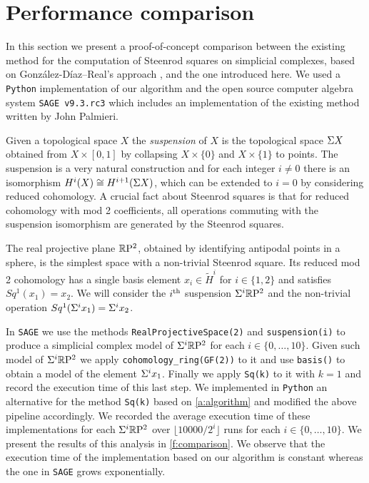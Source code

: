 
\section{Performance comparison} \label{s:comparison}

In this section we present a proof-of-concept comparison between the existing method for the computation of Steenrod squares on simplicial complexes, based on Gonz\'alez-D\'iaz--Real's approach \cite[Corollary 3.2]{gonzalez1999combinatorial}, and the one introduced here.
We used a \verb|Python| implementation of our algorithm and the open source computer algebra system \verb|SAGE v9.3.rc3| \cite{sagemath} which includes an implementation of the existing method written by John Palmieri.

Given a topological space $X$ the \textit{suspension} of $X$ is the topological space $\Sigma X$ obtained from $X \times [0,1]$ by collapsing $X \times \{0\}$ and $X \times \{1\}$ to points.
The suspension is a very natural construction and for each integer $i \neq 0$ there is an isomorphism $H^i(X) \cong H^{i+1}(\Sigma X)$, which can be extended to $i = 0$ by considering reduced cohomology.
A crucial fact about Steenrod squares is that for reduced cohomology with mod 2 coefficients, all operations commuting with the suspension isomorphism are generated by the Steenrod squares.

The real projective plane $\mathbb{R}\mathrm{P}^2$, obtained by identifying antipodal points in a sphere, is the simplest space with a non-trivial Steenrod square.
Its reduced mod 2 cohomology has a single basis element $x_i \in \widetilde{H}^i$ for $i \in \{1, 2\}$ and satisfies $Sq^1(x_1) = x_2$.
We will consider the $i^\mathrm{th}$ suspension $\Sigma^i \mathbb{R}\mathrm{P}^2$ and the non-trivial operation $Sq^1(\Sigma^i x_1) = \Sigma^i x_2$.

In \verb|SAGE| we use the methods \verb|RealProjectiveSpace(2)| and \verb|suspension(i)| to produce a simplicial complex model of $\Sigma^i \mathbb{R}\mathrm{P}^2$ for each $i \in \{0, \dots, 10\}$.
Given such model of $\Sigma^i \mathbb{R}\mathrm{P}^2$ we apply \verb|cohomology_ring(GF(2))| to it and use \verb|basis()| to obtain a model of the element $\Sigma^i x_1$.
Finally we apply \verb|Sq(k)| to it with $k=1$ and record the execution time of this last step.
We implemented in \verb|Python| an alternative for the method \verb|Sq(k)| based on \cref{a:algorithm} and modified the above pipeline accordingly.
We recorded the average execution time of these implementations for each $\Sigma^i \mathbb{R}\mathrm{P}^2$ over $\lfloor 10000/2^i \rfloor$ runs for each $i \in \{0, \dots, 10\}$. We present the results of this analysis in \cref{f:comparison}.
We observe that the execution time of the implementation based on our algorithm is constant whereas the one in \verb|SAGE| grows exponentially.

